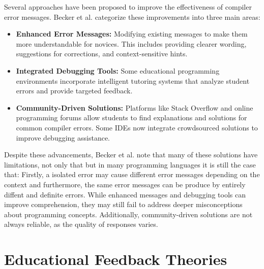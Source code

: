 

Several approaches have been proposed to improve the effectiveness of compiler error messages.
Becker et al. categorize these improvements into three main areas:

\begin{itemize}[nosep]
    \item \textbf{Enhanced Error Messages:} Modifying existing messages to make them more understandable for novices.
        This includes providing clearer wording, suggestions for corrections, and context-sensitive hints.
    \item \textbf{Integrated Debugging Tools:} Some educational programming environments incorporate intelligent tutoring systems that analyze student errors and provide targeted feedback.
    \item \textbf{Community-Driven Solutions:} Platforms like Stack Overflow and online programming forums allow students to find explanations and solutions for common compiler errors.
        Some IDEs now integrate crowdsourced solutions to improve debugging assistance.
\end{itemize}

\noindent Despite these advancements, Becker et al. \cite{becker} note that many of these solutions have limitations, not only that but in many programming languages it is still the case that:
Firstly, a isolated error may cause different error messages depending on the context and furthermore, the same error messages can be produce by entirely diffent and definite errors.
While enhanced messages and debugging tools can improve comprehension, they may still fail to address deeper misconceptions about programming concepts.
Additionally, community-driven solutions are not always reliable, as the quality of responses varies.


\section{Educational Feedback Theories} %




